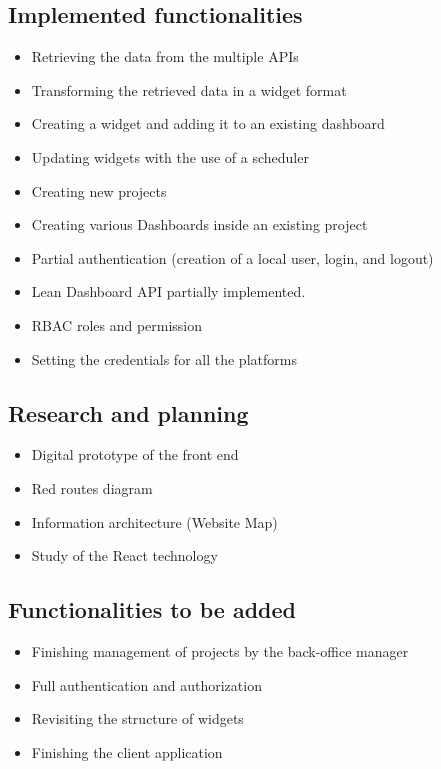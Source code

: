 \documentclass[a4paper,twoside,10pt]{report}
\begin{document}
\subsection{Implemented functionalities}
\begin{itemize}
    \item Retrieving the data from the multiple APIs
    \item Transforming the retrieved data in a widget format
    \item Creating a widget and adding it to an existing dashboard
    \item Updating widgets with the use of a scheduler
    \item Creating new projects
    \item Creating various Dashboards inside an existing project
    \item Partial authentication (creation of a local user, login, and logout)
    \item Lean Dashboard API partially implemented.
    \item RBAC roles and permission
    \item Setting the credentials for all the platforms
\end{itemize}

\newpage
\subsection{Research and planning}
\begin{itemize}
    \item Digital prototype of the front end
    \item Red routes diagram
    \item Information architecture (Website Map)
    \item Study of the React technology
\end{itemize}

\subsection{Functionalities to be added}
\begin{itemize}
    \item Finishing management of projects by the back-office manager
    \item Full authentication and authorization
    \item Revisiting the structure of widgets
    \item Finishing the client application
\end{itemize}
\end{document}
